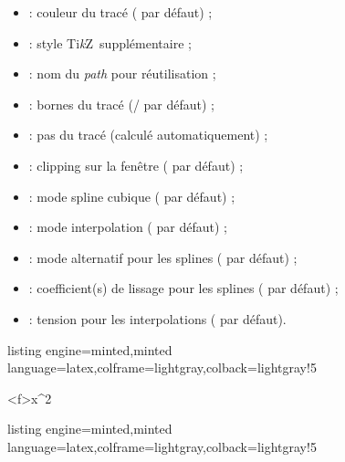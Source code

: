 \documentclass[11pt,a4paper]{ltxdoc}
\providecommand\tikzlogo{Ti\textit{k}Z}
\let\TikZ\tikzlogo
\begin{document}
\begin{itemize}
  \item {} : couleur du tracé ( par défaut) ;
  \item {} : style \TikZ\ supplémentaire ;
  \item {} : nom du \textit{path} pour réutilisation ;
  \item {} : bornes du tracé (/ par défaut) ;
  \item {} : pas du tracé (calculé automatiquement) ;
  \item {} : clipping sur la fenêtre ( par défaut) ;
  \item {} : mode spline cubique ( par défaut) ;
  \item {} : mode interpolation ( par défaut) ;
  \item {} : mode alternatif pour les splines ( par défaut) ;
  \item {} : coefficient(s) de lissage pour les splines ( par défaut) ;
  \item {} : tension pour les interpolations ( par défaut).
\end{itemize}

\begin{tcblisting}{listing engine=minted,minted language=latex,colframe=lightgray,colback=lightgray!5}
\begin{GraphiqueTikz}[x=1cm,y=0.5cm,Xmin=-3,Xmax=5,Ymin=-3,Ymax=9]
  \DefinirCourbe[Nom=cf,Trace,Couleur=blue]<f>{x^2}
\end{GraphiqueTikz}
\end{tcblisting}

\begin{tcblisting}{listing engine=minted,minted language=latex,colframe=lightgray,colback=lightgray!5}
\def\LISTESPLINE{-4/1/0 § -1/-2/0 § 2/2/0}
\begin{GraphiqueTikz}[x=0.9cm,y=1cm,Xmin=-5,Xmax=6,Ymin=-3,Ymax=5]
  \DefinirCourbeSpline[Trace,Couleur=olive]{\LISTESPLINE}
  \TracerTransformee[Spline,Couleur=red]{\LISTESPLINE}{2}{1}
\end{GraphiqueTikz}
\end{tcblisting}
\end{document}
